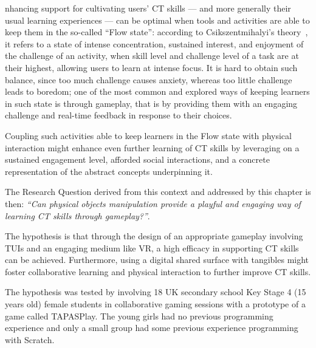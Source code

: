 nhancing support for cultivating users' \ac{CT} skills --- and more generally their usual learning experiences --- can be optimal when tools and activities are able to keep them in the so-called ``Flow state'': according to Csikszentmihalyi's theory~\cite{nakamura2014concept}, it refers to a state of intense concentration, sustained interest, and enjoyment of the challenge of an activity, when skill level and challenge level of a task are at their highest, allowing users to learn at intense focus. It is hard to obtain such balance, since too much challenge causes anxiety, whereas too little challenge leads to boredom; one of the most common and explored ways of keeping learners in such state is through gameplay, that is by providing them with an engaging challenge and real-time feedback in response to their choices.

Coupling such activities able to keep learners in the Flow state with physical interaction might enhance even further learning of \ac{CT} skills by leveraging on a sustained engagement level, afforded social interactions, and a concrete representation of the abstract concepts underpinning it.

The Research Question derived from this context and addressed by this chapter is then: \textit{``Can physical objects manipulation provide a playful and engaging way of learning \ac{CT} skills through gameplay?''}.

The hypothesis is that through the design of an appropriate gameplay involving \acp{TUI} and an engaging medium like \ac{VR}, a high efficacy in supporting \ac{CT} skills can be achieved. Furthermore, using a digital shared surface with tangibles might foster collaborative learning and physical interaction to further improve \ac{CT} skills.

The hypothesis was tested by involving 18 UK secondary school Key Stage 4 (15 years old) female students in collaborative gaming sessions with a prototype of a game called TAPASPlay. The young girls had no previous programming experience and only a small group had some previous experience programming with Scratch.


